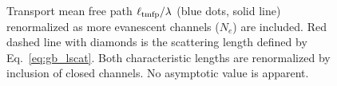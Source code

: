 \begin{figure}
\vskip -0.5cm
\centerline{
}
\vskip -0.2cm
\caption[Transport mean free path $\ell_{\rm tmfp}/\lambda$ (blue dots, solid line) renormalized as more evanescent channels ($N_e$) are included.]{Transport mean free path $\ell_{\rm tmfp}/\lambda$ (blue dots, solid line) renormalized as more evanescent channels ($N_e$) are included. %
Red dashed line with diamonds is the scattering length defined by Eq.~\ref{eq:gb_lscat}. Both characteristic lengths are renormalized by inclusion of closed channels. No asymptotic value is apparent. 
}
\label{fig:lscat_ltmfp}
\end{figure}



